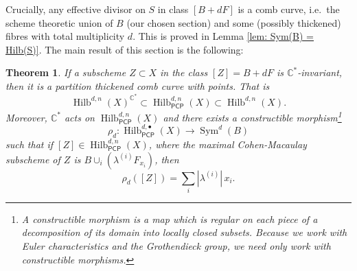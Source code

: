 \documentclass[12pt]{amsart}
\newtheorem{theorem}{Theorem}%
\theoremstyle{definition}
\newcommand{\CC} {\mathbb{C}}          %
\newcommand{\Sym}{\operatorname{Sym}}
\newcommand{\Hilb}{\operatorname{Hilb}}
\newcommand{\PCP}{\mathsf{PCP}}
\begin{document}
Crucially, any effective divisor on $S$ in class $[B+dF]$ is a comb
curve, i.e.~the scheme theoretic union of $B$ (our chosen section) and
some (possibly thickened) fibres with total multiplicity $d$. This is
proved in Lemma \ref{lem: Sym(B) = Hilb(S)}. The main result of this
section is the following:
\begin{theorem}\label{thm: C* invariant curves are partition thickened
comb curves with embedded points} If a subscheme $Z\subset X$ in the
class $[Z]=B+dF$ is $\CC^{*}$-invariant, then it is a partition
thickened comb curve with points. That is
\[
\Hilb^{d,n}(X)^{\CC^{*}}\subset \Hilb^{d,n}_{\PCP }(X)\subset \Hilb^{d,n}(X).
\]
Moreover, $\CC^{*}$ acts
on $\Hilb^{d,n}_{\PCP}(X)$ and there
exists a constructible morphism\footnote{A
constructible morphism is a map which is regular on each piece of a
decomposition of its domain into locally closed subsets. Because we
work with Euler characteristics and the Grothendieck group, we need
only work with constructible morphisms.}
\begin{equation}\label{eqn: rho : HilbPCP-->Sym(B)}
\rho_{d}: \Hilb^{d,\bullet}_{\PCP }(X) \to  \Sym^{d}(B)
\end{equation}
such that if $[Z]\in \Hilb_{\PCP}^{d,n}(X)$, where the maximal
Cohen-Macaulay subscheme of $Z$ is $B\cup_{i}\left(\lambda^{(i)}F_{x_{i}}
\right)$, then
\[
\rho_{d}([Z]) = \sum_{i} |\lambda^{(i)}|\,x_{i}. 
\]
\end{theorem}
\end{document}

